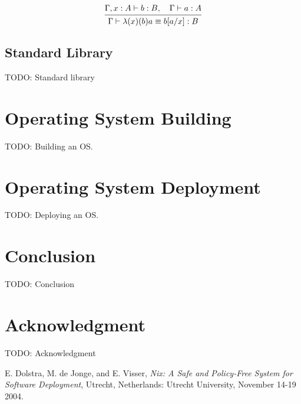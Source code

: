 \documentclass[conference]{IEEEtran}
\begin{document}
\[
\begin{prooftree}
    \hypo { \Gamma, x : A \vdash b : B,
            \quad \Gamma \vdash a : A }
    \infer1 { \Gamma \vdash \lambda(x)(b) a \equiv b[a/x] : B }
\end{prooftree}
\]

\subsection{Standard Library}

TODO: Standard library

\section{Operating System Building}

TODO: Building an OS.

\section{Operating System Deployment}

TODO: Deploying an OS.

\section{Conclusion}

TODO: Conclusion

\section*{Acknowledgment}

TODO: Acknowledgment

\begin{thebibliography}{1}

 E. Dolstra, M. de Jonge, and E. Visser, \emph{Nix: A Safe and Policy-Free System for Software Deployment}, Utrecht, Netherlands: Utrecht University, November 14-19 2004.

\end{thebibliography}
\end{document}
